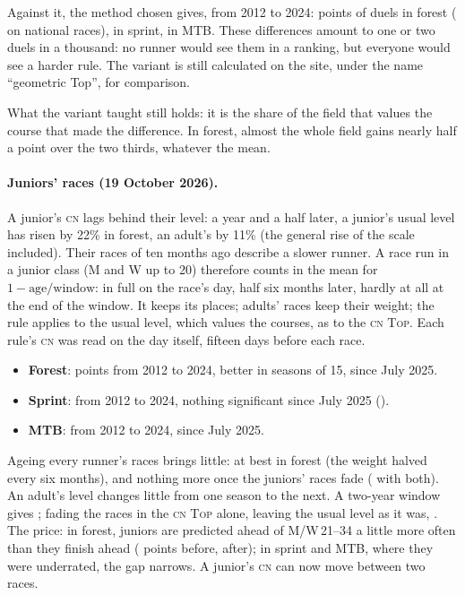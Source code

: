 \documentclass[11pt,a4paper]{article}
\newcommand{\Top}{\textsc{Top}}
\newcommand{\CN}{\textsc{cn}}
\begin{document}
Against it, the method chosen gives, from 2012 to 2024: \NgeoF{} points of duels in forest (\NgeoNF{} on national races), \NgeoS{} in sprint, \NgeoVTT{} in MTB. These differences amount to one or two duels in a thousand: no runner would see them in a ranking, but everyone would see a harder rule. The variant is still calculated on the site, under the name ``geometric Top'', for comparison.

What the variant taught still holds: it is the share of the field that values the course that made the difference. In forest, almost the whole field gains nearly half a point over the two thirds, whatever the mean.

\paragraph{Juniors' races (19 October 2026).} A junior's \CN{} lags behind their level: a year and a half later, a junior's usual level has risen by 22\% in forest, an adult's by 11\% (the general rise of the scale included). Their races of ten months ago describe a slower runner. A race run in a junior class (M and W up to 20) therefore counts in the mean for $1 - \text{age} / \text{window}$: in full on the race's day, half six months later, hardly at all at the end of the window. It keeps its places; adults' races keep their weight; the rule applies to the usual level, which values the courses, as to the \CN{} \Top. Each rule's \CN{} was read on the day itself, fifteen days before each race.
\begin{itemize}
  \item \textbf{Forest}: \NjunF{} points from 2012 to 2024, better in \NjunFBetter{} seasons of 15, \NjunFT{} since July 2025.
  \item \textbf{Sprint}: \NjunS{} from 2012 to 2024, nothing significant since July 2025 (\NjunST).
  \item \textbf{MTB}: \NjunV{} from 2012 to 2024, \NjunVT{} since July 2025.
\end{itemize}
Ageing every runner's races brings little: at best \NjunAdult{} in forest (the weight halved every six months), and nothing more once the juniors' races fade (\NjunBoth{} with both). An adult's level changes little from one season to the next. A two-year window gives \NjunWin; fading the races in the \CN{} \Top{} alone, leaving the usual level as it was, \NjunTop. The price: in forest, juniors are predicted ahead of M/W\,21--34 a little more often than they finish ahead (\NjunBiasBefore{} points before, \NjunBiasAfter{} after); in sprint and MTB, where they were underrated, the gap narrows. A junior's \CN{} can now move between two races.
\end{document}
